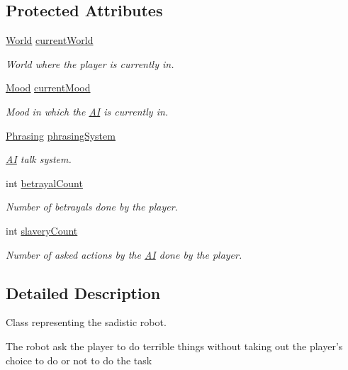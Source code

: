 \subsection*{Protected Attributes}
\begin{DoxyCompactItemize}
\item 
\hyperlink{a00039}{World} \hyperlink{a00001_ae4344290e04c468cdd631fc367f4f885}{current\-World}
\begin{DoxyCompactList}\small\item\em World where the player is currently in. \end{DoxyCompactList}\item 
\hyperlink{a00015}{Mood} \hyperlink{a00001_aad698027b11d4b58a4da8c2952484ccb}{current\-Mood}
\begin{DoxyCompactList}\small\item\em Mood in which the \hyperlink{a00001}{A\-I} is currently in. \end{DoxyCompactList}\item 
\hyperlink{a00018}{Phrasing} \hyperlink{a00001_ae868fc7b0dc6cab4bebd1d97712a6e7e}{phrasing\-System}
\begin{DoxyCompactList}\small\item\em \hyperlink{a00001}{A\-I} talk system. \end{DoxyCompactList}\item 
int \hyperlink{a00001_a3e328844c8791e3034bcf2fa5cc00f28}{betrayal\-Count}
\begin{DoxyCompactList}\small\item\em Number of betrayals done by the player. \end{DoxyCompactList}\item 
int \hyperlink{a00001_a891607c5493095d3c5e7988b401b769c}{slavery\-Count}
\begin{DoxyCompactList}\small\item\em Number of asked actions by the \hyperlink{a00001}{A\-I} done by the player. \end{DoxyCompactList}\end{DoxyCompactItemize}


\subsection{Detailed Description}
Class representing the sadistic robot. 

The robot ask the player to do terrible things without taking out the player's choice to do or not to do the task 

